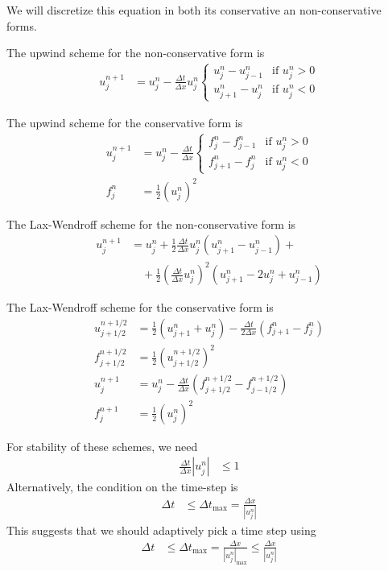 \documentclass[twocolumn]{myarticle}
\begin{document}
We will discretize this equation in both its conservative an non-conservative forms.

The upwind scheme for the non-conservative form is
\begin{align}
u^{n+1}_j &= u^n_j - \frac{\Delta t}{\Delta x} u^n_j \begin{cases} u^n_j - u^n_{j-1} & \text{if } u^n_j > 0 \\ u^n_{j+1} - u^n_j & \text{if } u^n_j < 0 \end{cases}
\end{align}

The upwind scheme for the conservative form is
\begin{align}
    u^{n+1}_j &= u^n_j - \frac{\Delta t}{\Delta x} \begin{cases} f^n_j - f^n_{j-1} & \text{if } u^n_j > 0 \\ f^n_{j+1} - f^n_j & \text{if } u^n_j < 0 \end{cases}
    \\
    f^n_j &= \frac{1}{2} \left( u^n_j \right)^2
\end{align}

The Lax-Wendroff scheme for the non-conservative form is
\begin{align}
    u^{n+1}_j &= u^n_j + \frac{1}{2} \frac{\Delta t}{\Delta x} u^n_j \left(u^{n}_{j+1} - u^{n}_{j-1}\right) + \nonumber
    \\
    & \quad + \frac{1}{2} \left( \frac{\Delta t}{\Delta x} u^n_j \right)^2 \left(u^{n}_{j+1} - 2 u^n_j + u^{n}_{j-1}\right) 
\end{align}

The Lax-Wendroff scheme for the conservative form is
\begin{align}
    u^{n+1/2}_{j+1/2} &= \frac{1}{2} \left( u^n_{j+1} + u^n_{j} \right) - \frac{\Delta t}{2 \Delta x} \left( f^n_{j+1} - f^n_{j} \right)
    \\
    f^{n+1/2}_{j+1/2} &= \frac{1}{2} \left( u^{n+1/2}_{j+1/2} \right)^2
    \\
    u^{n+1}_j &= u^n_j - \frac{\Delta t}{\Delta x} \left( f^{n+1/2}_{j+1/2} - f^{n+1/2}_{j-1/2} \right)
    \\
    f^{n+1}_j &= \frac{1}{2} \left( u^n_j \right)^2
\end{align}

For stability of these schemes, we need
\begin{align}
    \frac{\Delta t}{\Delta x} \left| u^n_j \right| &\leq 1
\end{align}
Alternatively, the condition on the time-step is
\begin{align}
    \Delta t &\leq \Delta t_\text{max} = \frac{\Delta x}{\left| u^n_j \right|}
\end{align}
This suggests that we should adaptively pick a time step using
\begin{align}
    \Delta t &\leq \Delta t_\text{max} = \frac{\Delta x}{\left| u^n_j \right|_\text{max}} \leq \frac{\Delta x}{\left| u^n_j \right|}
\end{align}
\end{document}
